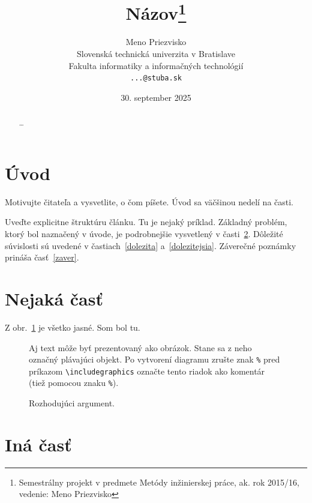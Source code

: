 \documentclass[10pt,twoside,slovak,a4paper]{article}
\title{Názov\thanks{Semestrálny projekt v predmete Metódy inžinierskej práce, ak. rok 2015/16, vedenie: Meno Priezvisko}} %
\author{Meno Priezvisko\\[2pt]
	{\small Slovenská technická univerzita v Bratislave}\\
	{\small Fakulta informatiky a informačných technológií}\\
	{\small \texttt{...@stuba.sk}}
	}
\date{\small 30. september 2025} %
\begin{document}
\maketitle

\begin{abstract}
\ldots
\end{abstract}



\section{Úvod}

Motivujte čitateľa a vysvetlite, o čom píšete. Úvod sa väčšinou nedelí na časti.

Uveďte explicitne štruktúru článku. Tu je nejaký príklad.
Základný problém, ktorý bol naznačený v úvode, je podrobnejšie vysvetlený v časti~\ref{nejaka}.
Dôležité súvislosti sú uvedené v častiach~\ref{dolezita} a~\ref{dolezitejsia}.
Záverečné poznámky prináša časť~\ref{zaver}.



\section{Nejaká časť} \label{nejaka}

Z obr.~\ref{f:rozhod} je všetko jasné. 
Som bol tu.
\begin{figure}[tbh]
\centering
Aj text môže byť prezentovaný ako obrázok. Stane sa z neho označný plávajúci objekt. Po vytvorení diagramu zrušte znak \texttt{\%} pred príkazom \verb|\includegraphics| označte tento riadok ako komentár (tiež pomocou znaku \texttt{\%}).
\caption{Rozhodujúci argument.}
\label{f:rozhod}
\end{figure}



\section{Iná časť} \label{ina}
\end{document}

